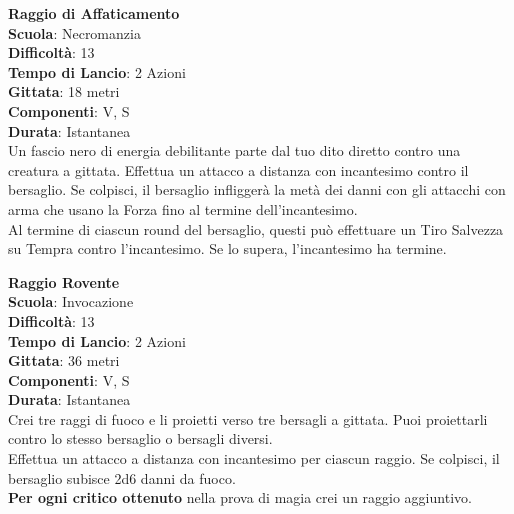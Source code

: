 \begin{multicols}{2}
\medskip\textbf{Raggio di Affaticamento}\\
\textbf{Scuola}: Necromanzia\\
\textbf{Difficoltà}:  13\\
\textbf{Tempo di Lancio}: 2 Azioni\\
\textbf{Gittata}: 18 metri\\
\textbf{Componenti}: V, S\\
\textbf{Durata}: Istantanea\\
Un fascio nero di energia debilitante parte dal tuo dito diretto contro una creatura a gittata. Effettua un attacco a distanza con incantesimo contro il bersaglio. Se colpisci, il bersaglio infliggerà la metà dei danni con gli attacchi con arma che usano la Forza fino al termine dell'incantesimo.\\ 
Al termine di ciascun round del bersaglio, questi può effettuare un Tiro Salvezza su Tempra contro l'incantesimo. Se lo supera, l'incantesimo ha termine.

\medskip\textbf{Raggio Rovente}\\
\textbf{Scuola}: Invocazione\\
\textbf{Difficoltà}:  13\\
\textbf{Tempo di Lancio}: 2 Azioni\\
\textbf{Gittata}: 36 metri\\
\textbf{Componenti}: V, S\\
\textbf{Durata}: Istantanea\\
Crei tre raggi di fuoco e li proietti verso tre bersagli a gittata. Puoi proiettarli contro lo stesso bersaglio o bersagli diversi.\\
Effettua un attacco a distanza con incantesimo per ciascun raggio. Se colpisci, il bersaglio subisce 2d6 danni da fuoco.\\
\textbf{Per ogni critico ottenuto} nella prova di magia crei un raggio aggiuntivo.


\end{multicols}
